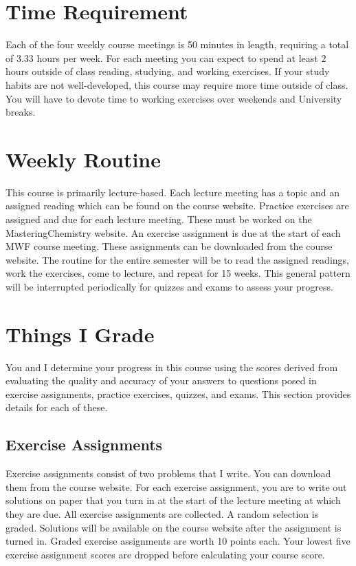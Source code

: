 \documentclass[letterpaper,oneside,onecolumn,11pt,article]{memoir}
\begin{document}
\section{Time Requirement}

Each of the four weekly course meetings is 50 minutes in length, requiring a total of $3.33$ hours per week. For each meeting you can expect to spend at least $2$ hours outside of class reading, studying, and working exercises. If your study habits are not well-developed, this course may require more time outside of class. You will have to devote time to working exercises over weekends and University breaks. 
%
%
\section{Weekly Routine}
This course is primarily lecture-based. Each lecture meeting has a topic and an assigned reading which can be found on the course website. Practice exercises are assigned and due for each lecture meeting. These must be worked on the MasteringChemistry website. An exercise assignment is due at the start of each MWF course meeting. These assignments can be downloaded from the course website. The routine for the entire semester will be to read the assigned readings, work the exercises, come to lecture, and repeat for 15 weeks. This general pattern will be interrupted periodically for quizzes and exams to assess your progress. 
%
%
\section{Things I Grade}
You and I determine your progress in this course using the scores derived from evaluating the quality and accuracy of your answers to questions posed in exercise assignments, practice exercises, quizzes, and exams. This section provides details for each of these.

\subsection{Exercise Assignments}
Exercise assignments consist of two problems that I write. You can download them from the course website. For each exercise assignment, you are to write out solutions on paper that you turn in at the start of the lecture meeting at which they are due. All exercise assignments are collected. A random selection is graded. Solutions will be available on the course website after the assignment is turned in. Graded exercise assignments are worth 10 points each. Your lowest five exercise assignment scores are dropped before calculating your course score. 
\end{document}

